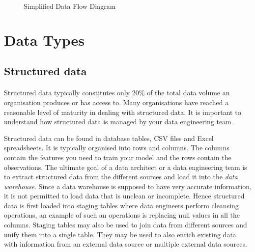 \documentclass[a4paper, 11pt]{article}
\begin{document}
    \begin{figure}[ht]
        \centering
        \caption{Simplified Data Flow Diagram}
        \label{fig:dataflow}
    \end{figure}


    \section{Data Types}

    \subsection{Structured data}

    \paragraph{}
    Structured data typically constitutes only 20\% of the total data volume an organisation produces or has access to.
    Many organisations have reached a reasonable level of maturity in dealing with structured data.
    It is important to understand how structured data is managed by your data engineering team.

    Structured data can be found in database tables, CSV files and Excel spreadsheets.
    It is typically organised into rows and columns.
    The columns contain the features you need to train your model and the rows contain the observations.
    The ultimate goal of a data architect or a data engineering team is to extract structured data from the different sources and load it into the \textit{data warehouse}.
    Since a data warehouse is supposed to have very accurate information, it is not permitted to load data that is unclean or incomplete.
    Hence structured data is first loaded into staging tables where data engineers perform cleansing operations, an example of such an operations is replacing null values in all the columns.
    Staging tables may also be used to join data from different sources and unify them into a single table.
    They may be used to also enrich existing data with information from an external data source or multiple external data sources.
\end{document}
